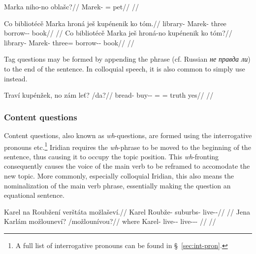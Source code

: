 \pex
\begingl
\gla Marka niho-no oblašc?//
\glb Marek-\Acc{} \N{}\Exst{}=\Q{} pet//
\glft {}//
\endgl
\xe

\pex
\a
\begingl
\gla Co bibliotécě Marka hroná ješ kupénenik ko tóm.//
\glb \Abl{} library-\Gen{} Marek-\Acc{} three \Exst{} borrow-\Pv{}-\Pf{} \Lnk{} book//
\glft {}//
\endgl
\a
\begingl
\gla Co bibliotécě Marka ješ hroná-no kupénenik ko tóm?//
\glb \Abl{} library-\Gen{} Marek-\Acc{} \Exst{} three=\Q{} borrow-\Pv{}-\Pf{} \Lnk{} book//
\glft {}//
\endgl
\xe

Tag questions may be formed by appending the phrase  (cf. Russian \textit{\cyrtext не
правда ли}) to the end of the sentence. In colloquial speech, it is also common
to simply use  instead.

\pex
\begingl
\gla Traví kupénžek, no zám le\v{t}? /da?//
\glb bread-\Gen{} buy-\Av{}-\Pf{} \Q{}= \Neg{}= truth yes//
\glft {}//
\endgl
\xe

\subsubsection{Content
questions}

Content questions, also known as \emph{wh}-questions, are formed using the
interrogative pronouns   
etc.\footnote{ A full list of interrogative pronouns can be found in
\S~\ref{sec:int-pron}. } Iridian requires the \emph{wh}-phrase to be moved to
the beginning of the sentence, thus causing it to occupy the topic position.
This \emph{wh}-fronting consequently
causes the voice of the main verb to be reframed to accomodate the new topic.
More commonly, especially colloquial Iridian, this
also means the nominalization of the main verb phrase,
essentially making the question an equational sentence.

\pex
\a\begingl
\gla Karel na Roubžení verštáta možlaševí.//
\glb Karel \Loc{} Roubže-\Gen{} suburbs-\Acc{} live-\Av{}-\Cont{}//
\glft {}//
\endgl
\a\begingl
\gla Jena Karlám možlouneví? /možlounívou?//
\glb where Karel-\Agt{} live-\Lv{}-\Cont{} live-\Lv{}-\Cont{}-\Nz{} //
\glft {}//
\endgl
\xe


